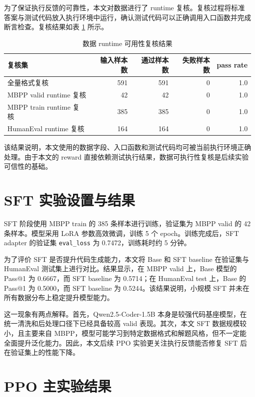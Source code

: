 为了保证执行反馈的可靠性，本文对数据进行了 runtime 复核。复核过程将标准答案与测试代码放入执行环境中运行，确认测试代码可以正确调用入口函数并完成断言检查。复核结果如表 \ref{tab:runtime-check} 所示。

\begin{table}[!htp]
  \centering
  \caption{数据 runtime 可用性复核结果}
  \label{tab:runtime-check}
  \begin{tabular}{lrrrr}
    \toprule
    复核集 & 输入样本数 & 通过样本数 & 失败样本数 & pass rate \\
    \midrule
    全量格式复核 & 591 & 591 & 0 & 1.0 \\
    MBPP valid runtime 复核 & 42 & 42 & 0 & 1.0 \\
    MBPP train runtime 复核 & 385 & 385 & 0 & 1.0 \\
    HumanEval runtime 复核 & 164 & 164 & 0 & 1.0 \\
    \bottomrule
  \end{tabular}
\end{table}

该结果说明，本文使用的数据字段、入口函数和测试代码均可被当前执行环境正确处理。由于本文的 reward 直接依赖测试执行结果，数据可执行性复核是后续实验可信性的基础。

\section{SFT 实验设置与结果}

SFT 阶段使用 MBPP train 的 385 条样本进行训练，验证集为 MBPP valid 的 42 条样本。模型采用 LoRA 参数高效微调，训练 5 个 epoch。训练完成后，SFT adapter 的验证集 \texttt{eval\_loss} 为 0.7472，训练耗时约 5 分钟。

为了评价 SFT 是否提升代码生成能力，本文将 Base 和 SFT baseline 在验证集与 HumanEval 测试集上进行对比。结果显示，在 MBPP valid 上，Base 模型的 Pass@1 为 0.6667，而 SFT baseline 为 0.5714；在 HumanEval test 上，Base 的 Pass@1 为 0.5000，而 SFT baseline 为 0.5244。该结果说明，小规模 SFT 并未在所有数据分布上稳定提升模型能力。

这一现象有两点解释。首先，Qwen2.5-Coder-1.5B 本身是较强代码基座模型，在统一清洗和后处理口径下已经具备较高 valid 表现。其次，本文 SFT 数据规模较小，且主要来自 MBPP，模型可能学习到特定数据格式和解题风格，但不一定能全面提升泛化能力。因此，本文后续 PPO 实验更关注执行反馈能否修复 SFT 后在验证集上的性能下降。

\section{PPO 主实验结果}


